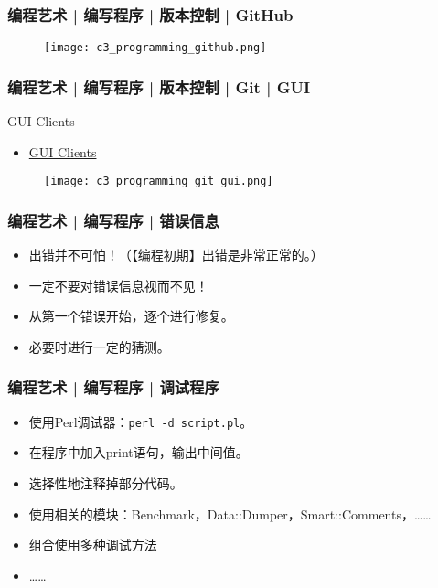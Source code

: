 \begin{frame}
  \frametitle{编程艺术 | 编写程序 | 版本控制 | GitHub}
  \begin{figure}
    \centering
    \texttt{[image: c3\_programming\_github.png]}
  \end{figure}
\end{frame}

\begin{frame}
  \frametitle{编程艺术 | 编写程序 | 版本控制 | Git | GUI}
  \begin{block}{GUI Clients}
    \begin{itemize}
      \item \href{https://git-scm.com/downloads/guis}{GUI Clients}
    \end{itemize}
  \end{block}
  \begin{figure}
    \centering
    \texttt{[image: c3\_programming\_git\_gui.png]}
  \end{figure}
\end{frame}

\begin{frame}
  \frametitle{编程艺术 | 编写程序 | 错误信息}
  \begin{itemize}
    \item 出错并不可怕！（【编程初期】出错是非常正常的。）
    \item 一定不要对错误信息视而不见！
    \item 从第一个错误开始，逐个进行修复。
    \item 必要时进行一定的猜测。
  \end{itemize}
\end{frame}

\begin{frame}[fragile]
  \frametitle{编程艺术 | 编写程序 | \alert{调试程序}}
  \begin{itemize}
    \item 使用Perl调试器：\verb|perl -d script.pl|。
    \item 在程序中加入print语句，输出中间值。
    \item 选择性地注释掉部分代码。
    \item 使用相关的模块：Benchmark，Data::Dumper，Smart::Comments，……
    \item 组合使用多种调试方法
    \item ……
  \end{itemize}
\end{frame}

